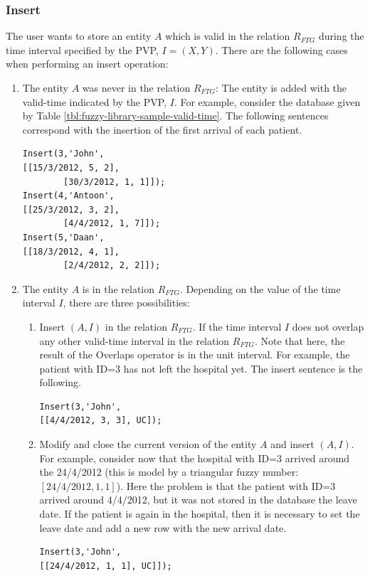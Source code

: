 \subsubsection{\label{subsubsec:insert-fuzzy-temporal}Insert}
The user wants to store an entity $A$ which is valid in the relation $R_{FTG}$ during the time interval specified by the PVP, $I = \left(X, Y \right)$.
%
%
There are the following cases when performing an insert operation:
\begin{enumerate}
\item The entity $A$ was never in the relation $R_{FTG}$: The entity is added with the valid-time indicated by the PVP, $I$.
For example, consider the database given by Table \ref{tbl:fuzzy-library-sample-valid-time}. The following sentences correspond with the insertion of the first arrival of each patient.

\begin{verbatim}
Insert(3,'John',
[[15/3/2012, 5, 2],
        [30/3/2012, 1, 1]]);
Insert(4,'Antoon',
[[25/3/2012, 3, 2], 
        [4/4/2012, 1, 7]]);
Insert(5,'Daan',
[[18/3/2012, 4, 1], 
        [2/4/2012, 2, 2]]);
\end{verbatim}





\item The entity $A$ is in the relation $R_{FTG}$. Depending on the value of the time interval $I$, there are three possibilities:
	\begin{enumerate}
	\item Insert $\left(A, I\right)$ in the relation $R_{FTG}$. If the time interval $I$ does not overlap any other valid-time interval in the relation $R_{FTG}$. Note that here, the result of the Overlaps operator is in the unit interval.
For example, the patient with ID=3 has not left the hospital yet. The insert sentence is the following.

 \begin{verbatim}
Insert(3,'John',
[[4/4/2012, 3, 3], UC]);
	      \end{verbatim}

	\item Modify and close the current version of the entity $A$ and insert $\left(A, I \right)$. For example, consider now that the hospital with ID=3 arrived  around the 24/4/2012 (this is model by a triangular fuzzy number: $\left[24/4/2012, 1, 1 \right]$). Here the problem is that the patient with ID=3 arrived around 4/4/2012, but it was not stored in the database the leave date. If the patient is again in the hospital, then it is necessary to set the leave date and add a new row with the new arrival date. %
	    \begin{verbatim}
Insert(3,'John',
[[24/4/2012, 1, 1], UC]]);
	      \end{verbatim}


\end{enumerate}
\end{enumerate}
